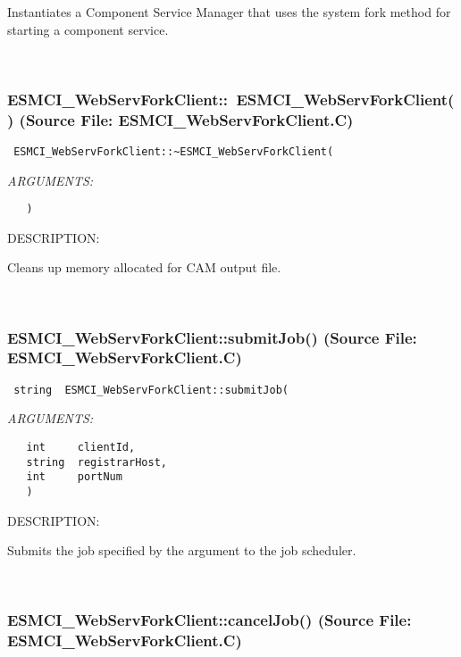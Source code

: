       Instantiates a Component Service Manager that uses the system fork
      method for starting a component service.
   
 
\mbox{}\hrulefill\
 
\subsubsection{ESMCI\_WebServForkClient::~ESMCI\_WebServForkClient() (Source File: ESMCI\_WebServForkClient.C)}


  
\begin{verbatim} ESMCI_WebServForkClient::~ESMCI_WebServForkClient(\end{verbatim}{\em ARGUMENTS:}
\begin{verbatim}   )\end{verbatim}
{\sf DESCRIPTION:\\ }


      Cleans up memory allocated for CAM output file.
   
 
\mbox{}\hrulefill\
 
\subsubsection{ESMCI\_WebServForkClient::submitJob() (Source File: ESMCI\_WebServForkClient.C)}


  
\begin{verbatim} string  ESMCI_WebServForkClient::submitJob(\end{verbatim}{\em ARGUMENTS:}
\begin{verbatim}   int     clientId,
   string  registrarHost,
   int     portNum
   )\end{verbatim}
{\sf DESCRIPTION:\\ }


      Submits the job specified by the argument to the job scheduler.
   
 
\mbox{}\hrulefill\
 
\subsubsection{ESMCI\_WebServForkClient::cancelJob() (Source File: ESMCI\_WebServForkClient.C)}


